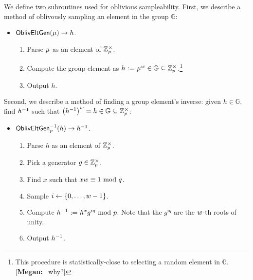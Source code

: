 \documentclass[11pt,letterpaper]{article}
\newcommand{\authnote}[2]{[{\color{red}\textbf{#1:}}~{\color{blue} #2}]}
\newcommand{\authnote}[2]{}
\newcommand{\megan}[1]{\authnote{Megan}{#1}}
\theoremstyle{plain} %
\theoremstyle{definition} %
\theoremstyle{remark} %
\newcommand{\eqdef}{\ {:=} \ }
\newcommand{\Bits}{\{0,1\}}
\newcommand{\Group}{\mathbb{G}}
\newcommand{\GrpOrd}{q}
\newcommand{\GrpEltH}{h}
\newcommand{\Generator}{g}
\begin{document}
We define two subroutines used for oblivious sampleability.
First, we describe a method of oblivously sampling an element in the group $\Group$:

\begin{itemize}
\item[]$\OblivEltGen(\RandStr) \to \GrpEltH$.
    \begin{enumerate}[nolistsep]
        \item Parse $\mu$ as an element of $\mathbb{Z}^{\times}_{p}$.
        \item Compute the group element as $\GrpEltH \eqdef \RandStr^{\OrdW} \in \Group \subseteq \MultGrp$.\footnote{This procedure is statistically-close to selecting a random element in $\Group$. \megan{why?}}
        \item Output $\GrpEltH$.
    \end{enumerate}
\end{itemize}

Second, we describe a method of finding a group element's inverse: given $\GrpEltH\in\Group$, find $\Inv{\GrpEltH}$ such that $\left(\Inv{\GrpEltH}\right)^\OrdW = \GrpEltH\in\Group\subseteq\MultGrp$:
\begin{itemize}
\item[]$\OblivEltInv_{\MultGrpOrd}(\GrpEltH) \to \Inv{\GrpEltH}$.
    \begin{enumerate}[nolistsep]
        \item Parse $\GrpEltH$ as an element of $\mathbb{Z}^{\times}_{p}$.
        \item Pick a generator $\Generator \in \MultGrp$.
        \item Find $x$ such that $x\OrdW \equiv 1 \text{ mod } \GrpOrd$.
        \item Sample $i \gets \{0, \ldots, w-1\}$.
        \item Compute $\Inv{\GrpEltH} \eqdef \GrpEltH^{x}\Generator^{i\GrpOrd} \text{ mod } \MultGrpOrd$. Note that the $\Generator^{i\GrpOrd}$ are the $w$-th roots of unity.
        \item Output $\Inv{\GrpEltH}$.
    \end{enumerate}
\end{itemize}
\end{document}
